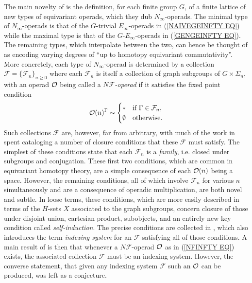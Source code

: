 \documentclass[a4paper,10pt]{article}%
\begin{document}
The main novelty of \cite{BH15} is the definition, for each finite group $G$, of a finite lattice of new types of equivariant operads, which they dub $N_{\infty}$-operads.
The minimal type of $N_{\infty}$-operads is that of the 
$G$-trivial $E_{\infty}$-operads in (\ref{NAIVEGEINFTY EQ}) 
while the maximal type is that of the $G$-$E_{\infty}$-operads in (\ref{GENGEINFTY EQ}).
The remaining types, which interpolate between 
the two,
can hence be thought of as encoding varying degrees of ``up to homotopy equivariant commutativity''.
More concretely, each type of $N_{\infty}$-operad is determined by a collection
$\mathcal{F} = \{\mathcal{F}_n\}_{n \geq 0}$
where each $\mathcal{F}_n$ is itself a collection of graph subgroups of $G \times \Sigma_n$,
with an operad $\mathcal{O}$ being called a
\textit{$N \mathcal{F}$-operad} if it satisfies the fixed point condition
\begin{equation}\label{NFINFTY EQ}
	\O(n)^{\Gamma} \sim 
\begin{cases}
	\** & \text{if } \Gamma \in \mathcal{F}_n,
\\
	\emptyset & \text{otherwise}.
\end{cases}
\end{equation}
Such collections $\mathcal{F}$ are, however, far from arbitrary, with much of the work in \cite[\S 3]{BH15} spent cataloging a number of closure conditions that these $\mathcal{F}$ must satisfy.
The simplest of these conditions
state that each $\mathcal{F}_n$ is a \textit{family}, i.e. closed under subgroups and conjugation. These first two conditions, which are common in equivariant homotopy theory,
are a simple consequence of each $\mathcal{O}(n)$ being a space.
However, the remaining conditions, 
all of which involve $\mathcal{F}_n$ for various $n$ simultaneously and are a consequence of operadic multiplication,
are both novel and subtle.
In loose terms, these conditions, 
which are more easily described in terms of the 
$H$-sets $X$ associated to the graph subgroups,
concern closure of those under 
disjoint union, cartesian product, subobjects,
and an entirely new key condition called \textit{self-induction}.
The precise conditions are collected in
\cite[Def. 3.22]{BH15},
which also introduces the term \textit{indexing system} for 
an $\mathcal{F}$ satisfying all of those conditions.
A main result of \cite[\S 4]{BH15} is then that whenever a $N\mathcal F$-operad $\mathcal{O}$ as in (\ref{NFINFTY EQ}) exists,
the associated collection $\mathcal{F}$ must be an indexing system.
However, the converse statement, that given any indexing system $\mathcal{F}$ such an $\mathcal{O}$ can be produced, was left as a conjecture.
\end{document}
